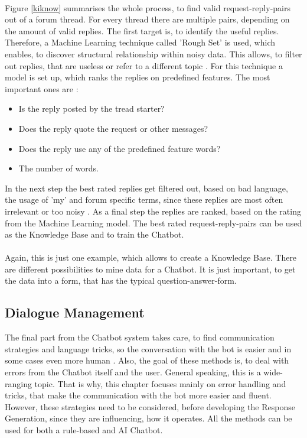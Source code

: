 \documentclass[10pt,final,journal,a4paper,oneside,twocolumn]{IEEEtran}
\begin{document}
\\Figure \ref{kiknow} summarises the whole process, to find valid request-reply-pairs out of a forum thread. For every thread there are multiple pairs, depending on the amount of valid replies. The first target is, to identify the useful replies. Therefore, a Machine Learning technique called 'Rough Set' is used, which enables, to discover structural relationship within noisy data. This allows, to filter out replies, that are useless or refer to a different topic \cite{b15}. For this technique a model is set up, which ranks the replies on predefined features. The most important ones are \cite{b15}: 
\begin{itemize}
	\item Is  the  reply  posted  by  the  tread  starter?
	\item Does the reply quote the request or other messages?
	\item Does the reply use any of the predefined feature words?
	\item The number of words.
\end{itemize} 
In the next step the best rated replies get filtered out, based on bad language, the usage of 'my' and forum specific terms, since these replies are most often irrelevant or too noisy \cite{b15}. As a final step the replies are ranked, based on the rating from the Machine Learning model. The best rated request-reply-pairs can be used as the Knowledge Base and to train the Chatbot.\\
\\
Again, this is just one example, which allows to create a Knowledge Base. There are different possibilities to mine data for a Chatbot. It is just important, to get the data into a form, that has the typical question-answer-form.

\subsection{Dialogue Management}\label{sec:dial}
The final part from the Chatbot system takes care, to find communication strategies and language tricks, so the conversation with the bot is easier and in some cases even more human \cite{b6}. Also, the goal of these methods is, to deal with errors from the Chatbot itself and the user. General speaking, this is a wide-ranging topic. That is why, this chapter focuses mainly on error handling and tricks, that make the communication with the bot more easier and fluent. However, these strategies need to be considered, before developing the Response Generation, since they are influencing, how it operates. All the methods can be used for both a rule-based and AI Chatbot.
\\
\end{document}
